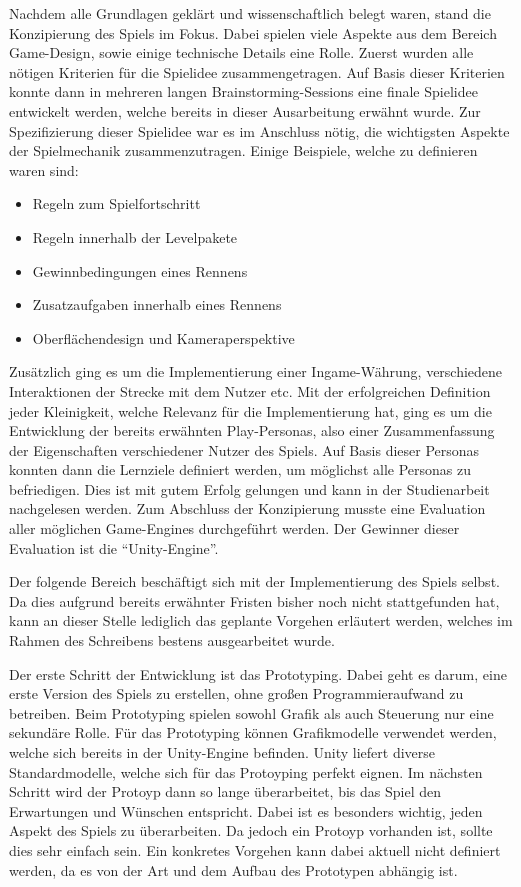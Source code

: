 	Nachdem alle Grundlagen geklärt und wissenschaftlich belegt waren, stand die Konzipierung des Spiels im Fokus. Dabei spielen viele Aspekte aus dem Bereich Game-Design, sowie einige technische Details eine Rolle.
	Zuerst wurden alle nötigen Kriterien für die Spielidee zusammengetragen. Auf Basis dieser Kriterien konnte dann in mehreren langen Brainstorming-Sessions eine finale Spielidee entwickelt werden, welche bereits in dieser Ausarbeitung erwähnt wurde.
	Zur Spezifizierung dieser Spielidee war es im Anschluss nötig, die wichtigsten Aspekte der Spielmechanik zusammenzutragen. Einige Beispiele, welche zu definieren waren sind:
	\begin{itemize}
		\item{Regeln zum Spielfortschritt}
		\item{Regeln innerhalb der Levelpakete}
		\item{Gewinnbedingungen eines Rennens}
		\item{Zusatzaufgaben innerhalb eines Rennens}
		\item{Oberflächendesign und Kameraperspektive}
	\end{itemize}
	Zusätzlich ging es um die Implementierung einer Ingame-Währung, verschiedene Interaktionen der Strecke mit dem Nutzer etc.
	Mit der erfolgreichen Definition jeder Kleinigkeit, welche Relevanz für die Implementierung hat, ging es um die Entwicklung der bereits erwähnten Play-Personas, also einer Zusammenfassung der Eigenschaften verschiedener Nutzer des Spiels. Auf Basis dieser Personas konnten dann die Lernziele definiert werden, um möglichst alle Personas zu befriedigen. Dies ist mit gutem Erfolg gelungen und kann in der Studienarbeit nachgelesen werden. Zum Abschluss der Konzipierung musste eine Evaluation aller möglichen Game-Engines durchgeführt werden. Der Gewinner dieser Evaluation ist die \enquote{Unity-Engine}.

	Der folgende Bereich beschäftigt sich mit der Implementierung des Spiels selbst. Da dies aufgrund bereits erwähnter Fristen bisher noch nicht stattgefunden hat, kann an dieser Stelle lediglich das geplante Vorgehen erläutert werden, welches im Rahmen des Schreibens bestens ausgearbeitet wurde.

	Der erste Schritt der Entwicklung ist das Prototyping. Dabei geht es darum, eine erste Version des Spiels zu erstellen, ohne großen Programmieraufwand zu betreiben. Beim Prototyping spielen sowohl Grafik als auch Steuerung nur eine sekundäre Rolle. Für das Prototyping können Grafikmodelle verwendet werden, welche sich bereits in der Unity-Engine befinden. Unity liefert diverse Standardmodelle, welche sich für das Protoyping perfekt eignen.
	Im nächsten Schritt wird der Protoyp dann so lange überarbeitet, bis das Spiel den Erwartungen und Wünschen entspricht. Dabei ist es besonders wichtig, jeden Aspekt des Spiels zu überarbeiten. Da jedoch ein Protoyp vorhanden ist, sollte dies sehr einfach sein.
	Ein konkretes Vorgehen kann dabei aktuell nicht definiert werden, da es von der Art und dem Aufbau des Prototypen abhängig ist.

